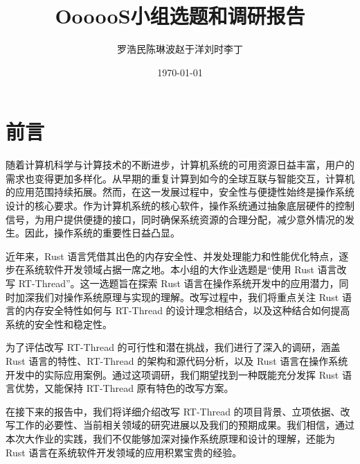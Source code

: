 \documentclass{ctexart}
\title{OooooS小组选题和调研报告}
\author{罗浩民\;陈琳波\;赵于洋\;刘时\;李丁}
\date{\today}
\begin{document}
\maketitle

\section{前言}
随着计算机科学与计算技术的不断进步，计算机系统的可用资源日益丰富，用户的需求也变得更加多样化。从早期的重复计算到如今的全球互联与智能交互，计算机的应用范围持续拓展。然而，在这一发展过程中，安全性与便捷性始终是操作系统设计的核心要求。作为计算机系统的核心软件，操作系统通过抽象底层硬件的控制信号，为用户提供便捷的接口，同时确保系统资源的合理分配，减少意外情况的发生。因此，操作系统的重要性日益凸显。

近年来，Rust 语言凭借其出色的内存安全性、并发处理能力和性能优化特点，逐步在系统软件开发领域占据一席之地。本小组的大作业选题是“使用 Rust 语言改写 RT-Thread”。这一选题旨在探索 Rust 语言在操作系统开发中的应用潜力，同时加深我们对操作系统原理与实现的理解。改写过程中，我们将重点关注 Rust 语言的内存安全特性如何与 RT-Thread 的设计理念相结合，以及这种结合如何提高系统的安全性和稳定性。

为了评估改写 RT-Thread 的可行性和潜在挑战，我们进行了深入的调研，涵盖 Rust 语言的特性、RT-Thread 的架构和源代码分析，以及 Rust 语言在操作系统开发中的实际应用案例。通过这项调研，我们期望找到一种既能充分发挥 Rust 语言优势，又能保持 RT-Thread 原有特色的改写方案。

在接下来的报告中，我们将详细介绍改写 RT-Thread 的项目背景、立项依据、改写工作的必要性、当前相关领域的研究进展以及我们的预期成果。我们相信，通过本次大作业的实践，我们不仅能够加深对操作系统原理和设计的理解，还能为 Rust 语言在系统软件开发领域的应用积累宝贵的经验。
\newpage
\tableofcontents
\newpage







\end{document}
